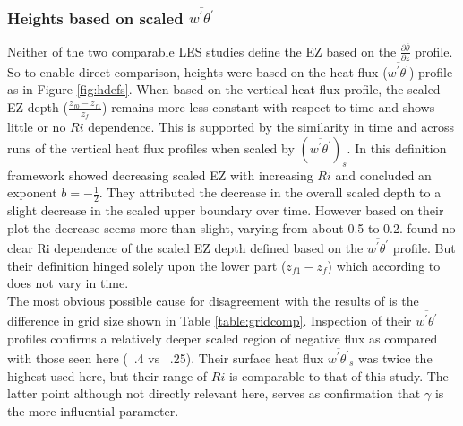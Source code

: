 \subsubsection{Heights based on scaled $\overline{w^{'}\theta^{'}}$}
Neither of the two comparable LES studies define the EZ based on the $\frac{\partial \overline{\theta}}{\partial z}$ profile.  So to enable direct comparison, heights were based on the heat flux ($\overline{w^{'}\theta^{'}}$) profile as in Figure \ref{fig:hdefs}. When based on the vertical heat flux profile, the scaled EZ depth ($\frac{z_{f0}-z_{f1}}{z_{f}}$) remains more less constant with respect to time and shows little or no $Ri$ dependence.  This is supported by the similarity in time and across runs of the vertical heat flux profiles when scaled by $(\overline{w^{'}\theta^{'}})_{s}$.  In this definition framework \cite{FedConzMir04} showed decreasing scaled EZ with increasing $Ri$ and concluded an exponent $b = -\frac{1}{2}$.  They attributed the decrease in the overall scaled depth to a slight decrease in the scaled upper boundary over time.  However based on their plot the decrease seems more than slight, varying from about 0.5 to 0.2.  \cite{BrooksFowler2} found no clear Ri dependence of the scaled EZ depth defined based on the $\overline{w^{'}\theta^{'}}$ profile.  But their definition hinged solely upon the lower part ($z_{f1} - z_{f}$) which according to \cite{FedConzMir04} does not vary in time.\\

The most obvious possible cause for disagreement with the results of \cite{FedConzMir04} is the difference in grid size shown in Table \ref{table:gridcomp}.  Inspection of their $\overline{w^{'}\theta^{'}}$ profiles confirms a relatively deeper scaled region of negative flux as compared with those seen here (~.4 vs ~.25). Their surface heat flux $\overline{w^{'}\theta^{'}}_{s}$ was twice the highest used here, but their range of $Ri$ is comparable to that of this study.  The latter point although not directly relevant here, serves as confirmation that $\gamma$ is the more influential parameter.\\


